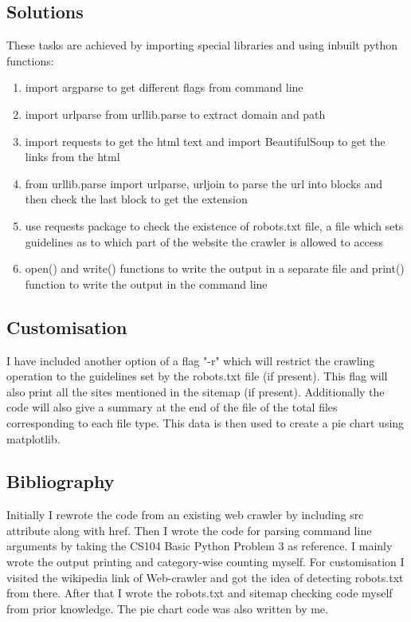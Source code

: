 \documentclass{article}
\begin{document}
\subsection{Solutions}

These tasks are achieved by importing special libraries and using inbuilt python functions:
\begin{enumerate}
    \item import argparse to get different flags from command line
    \item import urlparse from urllib.parse to extract domain and path
    \item import requests to get the html text and import BeautifulSoup to get the links from the html
    \item from urllib.parse import urlparse, urljoin to parse the url into blocks and then check the last block to get the extension
    \item use requests package to check the existence of robots.txt file, a file which sets guidelines as to which part of the website the crawler is allowed to access
    \item open() and write() functions to write the output in a separate file and print() function to write the output in the command line
\end{enumerate}

\subsection{Customisation}
    I have included another option of a flag "-r" which will restrict the crawling operation to the guidelines set by the robots.txt file (if present). This flag will also print all the sites mentioned in the sitemap (if present). Additionally the code will also give a summary at the end of the file of the total files corresponding to each file type. This data is then used to create a pie chart using matplotlib.

\subsection{Bibliography}
    Initially I rewrote the code from an existing web crawler \cite{gfg} by including src attribute along with href. Then I wrote the code for parsing command line arguments by taking the CS104 Basic Python Problem 3 as reference. I mainly wrote the output printing and category-wise counting myself. For customisation I visited the wikipedia link of Web-crawler and got the idea of detecting robots.txt from there. \cite{wkpd} After that I wrote the robots.txt and sitemap checking code myself from prior knowledge. The pie chart code was also written by me.
\end{document}
